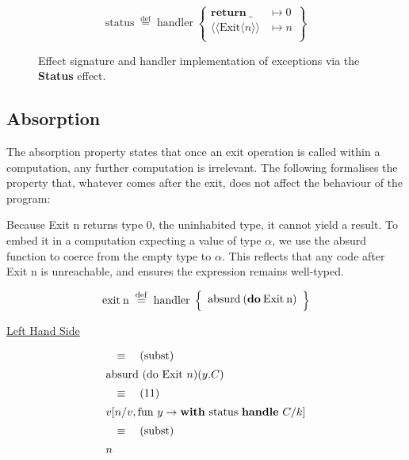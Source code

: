 \documentclass[logo,bsc,singlespacing,parskip]{infthesis}
\begin{document}
\begin{figure}[H]
\centering


\vspace{-1em}

\[
\mathrm{status} \;\overset{\mathrm{def}}{=}\;
\mathrm{handler} \;\left\{
\begin{array}{ll}
  \mathrm{\textbf{return}\:\_} & \mapsto 0 \\[0.5ex]
  \langle\!\langle \mathrm{Exit} \langle n\rangle\rangle & \mapsto n \\[0.5ex]
\end{array}
\right\}
\]

\caption{Effect signature and handler implementation of exceptions via the \textbf{Status} effect.}
\label{fig:status-handler}
\end{figure}

\subsection*{Absorption}

The absorption property states that once an exit operation is called within a computation, any further computation is irrelevant. The following formalises the property that, whatever comes after the exit, does not affect the behaviour of the program:


Because Exit n returns type 0, the uninhabited type, it cannot yield a result. To embed it in a computation expecting a value of type $\alpha$, we use the absurd function to coerce from the empty type to $\alpha$. This reflects that any code after Exit n is unreachable, and ensures the expression remains well-typed.

\[
\mathrm{exit\:n} \;\overset{\mathrm{def}}{=}\;
\mathrm{handler} \;\left\{
\begin{array}{l}
  \text{absurd\:(\textbf{do}\:Exit\:n)} \quad\\[0.5ex]

\end{array}
\right\}
\]

\underline{Left Hand Side}

\[
\begin{array}{l}
\quad\equiv\quad (\text{subst}) \\[5pt]
\text{absurd (do Exit } n) (y. C) \\[5pt]
\quad\equiv\quad (11) \\[5pt]
v [n/v, \text{fun } y \rightarrow \text{\textbf{with} status \textbf{handle} } C/k] \\[5pt]
\quad\equiv\quad (\text{subst}) \\[5pt]
n
\end{array}
\]
\end{document}
